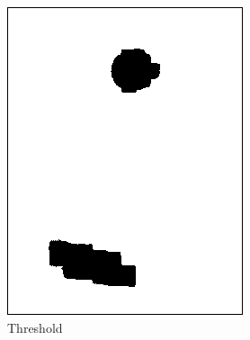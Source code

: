 \begin{figure}
\begin{subfigure}{0.25\textwidth}
\includegraphics[width=\textwidth]{img/motan_3}
\caption{Threshold}
\label{fig:motblob}
\end{subfigure}%
\begin{subfigure}{0.25\textwidth}

\end{subfigure}
\end{figure}
